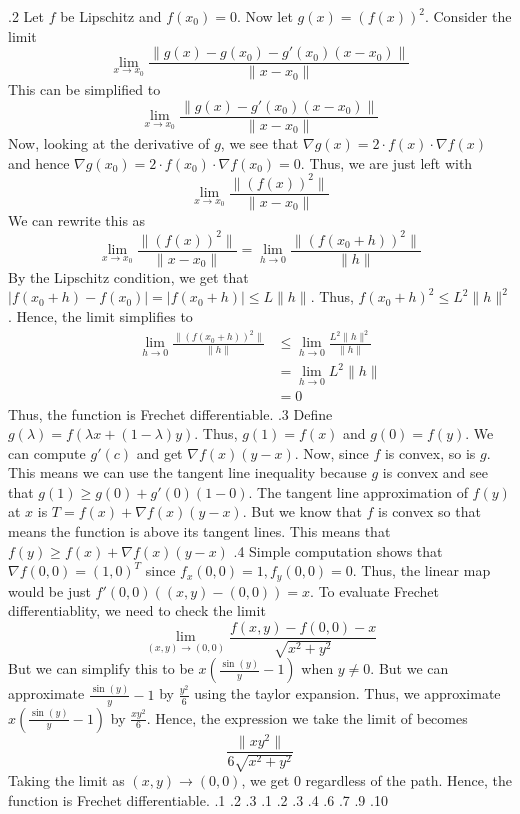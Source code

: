 \documentclass[12pt]{exam}
\begin{document}
\begin{questions}
.2\newline
Let $f$ be Lipschitz and $f(x_0) = 0$. Now let $g(x) = (f(x))^2$. Consider the limit \[\lim_{x \to x_0} \frac{\|g(x)-g(x_0)- g'(x_0)(x-x_0)\|}{\|x-x_0\|}\] This can be simplified to \[\lim_{x \to x_0} \frac{\|g(x)- g'(x_0)(x-x_0)\|}{\|x-x_0\|}\] Now, looking at the derivative of $g$, we see that $\nabla g(x) = 2\cdot f(x) \cdot \nabla f(x)$ and hence $\nabla g(x_0) =  2\cdot f(x_0) \cdot \nabla f(x_0) = 0$. Thus, we are just left with \[\lim_{x \to x_0} \frac{\|(f(x))^2\|}{\|x-x_0\|}\] We can rewrite this as 
\[
    \lim_{x \to x_0} \frac{\|(f(x))^2\|}{\|x-x_0\|} = \lim_{h \to 0} \frac{\|(f(x_0+h))^2\|}{\|h\|}
\]
By the Lipschitz condition, we get that $|f(x_0+h)-f(x_0)| =|f(x_0+h)| \leq L\|h\|$. Thus, $f(x_0+h)^2 \leq L^2\|h\|^2$. Hence, the limit simplifies to 
\begin{align*}
    \lim_{h \to 0} \frac{\|(f(x_0+h))^2\|}{\|h\|} &\leq \lim_{h \to 0} \frac{L^2\|h\|^2}{\|h\|}\\
    &=\lim_{h \to 0} L^2\|h\|\\
    &= 0
\end{align*}
Thus, the function is Frechet differentiable. 
.3 \newline
Define $g(\lambda) = f(\lambda x + (1-\lambda)y)$. Thus, $g(1) = f(x)$ and $g(0) = f(y)$. We can compute $g'(c)$ and get $\nabla f(x)(y-x)$. Now, since $f$ is convex, so is $g$. This means we can use the tangent line inequality because $g$ is convex and see that $g(1) \geq g(0) + g'(0)(1-0)$. The tangent line approximation of $f(y)$ at $x$ is $T = f(x)+\nabla f(x)(y-x)$. But we know that $f$ is convex so that means the function is above its tangent lines. This means that $f(y) \geq f(x) + \nabla f(x) (y-x)$
.4 \newline
Simple computation shows that $\nabla f(0,0) = (1,0)^T$ since $f_x(0,0) = 1, f_y(0,0)=0$. Thus, the linear map would be just $f'(0,0)((x,y)-(0,0)) = x$. To evaluate Frechet differentiablity, we need to check the limit \[\lim_{(x,y)\to(0,0)}\frac{f(x,y)-f(0,0)-x}{\sqrt{x^2+y^2}}\] But we can simplify this to be $x\left(\frac{\sin(y)}{y}-1\right)$ when $y \neq 0$. But we can approximate $\frac{\sin(y)}{y}-1$ by $\frac{y^2}{6}$ using the taylor expansion. Thus, we approximate $x\left(\frac{\sin(y)}{y}-1\right)$ by $\frac{xy^2}{6}$. Hence, the expression we take the limit of becomes \[\frac{\|xy^2\|}{6\sqrt{x^2+y^2}}\] Taking the limit as $(x,y) \to (0,0)$, we get $0$ regardless of the path. Hence, the function is Frechet differentiable. 
.1
.2
.3
.1
.2
.3
.4
.6
.7
.9
.10

\end{questions}
\end{document}
